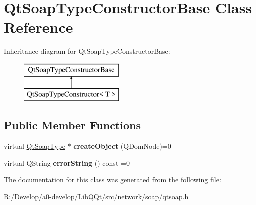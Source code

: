 \hypertarget{class_qt_soap_type_constructor_base}{}\section{Qt\+Soap\+Type\+Constructor\+Base Class Reference}
\label{class_qt_soap_type_constructor_base}
Inheritance diagram for Qt\+Soap\+Type\+Constructor\+Base\+:\begin{figure}[H]
\begin{center}
\leavevmode
\includegraphics[height=2.000000cm]{class_qt_soap_type_constructor_base}
\end{center}
\end{figure}
\subsection*{Public Member Functions}
\begin{DoxyCompactItemize}
\item 
\mbox{\label{class_qt_soap_type_constructor_base_aa82ba4d90a0e6101edad5e8689e338d9}} 
virtual \mbox{\hyperlink{class_qt_soap_type}{Qt\+Soap\+Type}} $\ast$ {\bfseries create\+Object} (Q\+Dom\+Node)=0
\item 
\mbox{\label{class_qt_soap_type_constructor_base_a4be9ea184c78e34beb1db3b1758f5221}} 
virtual Q\+String {\bfseries error\+String} () const =0
\end{DoxyCompactItemize}


The documentation for this class was generated from the following file\+:\begin{DoxyCompactItemize}
\item 
R\+:/\+Develop/a0-\/develop/\+Lib\+Q\+Qt/src/network/soap/qtsoap.\+h\end{DoxyCompactItemize}
